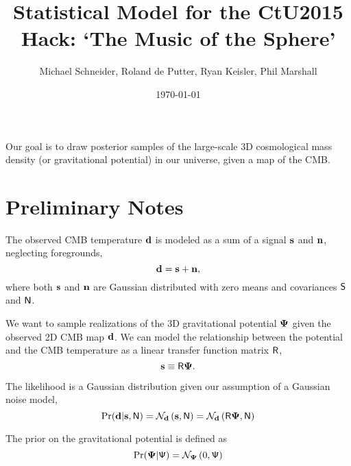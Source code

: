 \documentclass[11pt, letterpaper]{article}
\begin{document}
\title{Statistical Model for the CtU2015 Hack: `The Music of the Sphere'}

\author{Michael Schneider, Roland de Putter, Ryan Keisler, Phil Marshall}

\date{\today}

\maketitle


Our goal is to draw posterior samples of the large-scale 3D cosmological mass
density (or gravitational potential) in our universe, given a map of the CMB.


\section{Preliminary Notes}

The observed CMB temperature $\mathbf{d}$ is modeled as a sum of a signal $\mathbf{s}$
and $\mathbf{n}$, neglecting foregrounds,
\begin{equation}
	\mathbf{d} = \mathbf{s} + \mathbf{n},
\end{equation}
where both $\mathbf{s}$ and $\mathbf{n}$ are Gaussian distributed with zero means
and covariances $\mathsf{S}$ and $\mathsf{N}$.

We want to sample realizations of the 3D gravitational potential $\bm \Psi$
given the observed 2D CMB map $\mathbf{d}$. We can model the relationship between
the potential and the CMB temperature as a linear transfer function matrix
$\mathsf{R}$,
\begin{equation}
	\mathbf{s} \equiv \mathsf{R} \bm \Psi.
\end{equation}

The likelihood is a Gaussian distribution given our assumption of a
Gaussian noise model,
\begin{equation}
	{\rm Pr}(\mathbf{d} | \mathbf{s}, \mathsf{N}) = \mathcal{N}_{\mathbf{d}}
	\left(\mathbf{s}, \mathsf{N}\right)
	= \mathcal{N}_{\mathbf{d}} \left(\mathsf{R} \bm \Psi, \mathsf{N}\right)
\end{equation}

The prior on the gravitational potential is defined as
\begin{equation}
	{\rm Pr}(\bm \Psi | \mathsf{\Psi}) =
	\mathcal{N}_{\bm \Psi} \left(0, \mathsf{\Psi}\right)
\end{equation}

\end{document}
